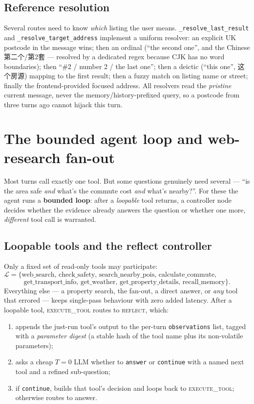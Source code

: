 \documentclass[11pt,a4paper]{article}
\newcommand{\code}[1]{\texttt{\small #1}}
\newcommand{\gnode}[1]{\textsc{#1}}  %
\begin{document}
\subsection{Reference resolution}
Several routes need to know \emph{which} listing the user means. \code{\_resolve\_last\_result}
and \code{\_resolve\_target\_address} implement a uniform resolver: an explicit UK
postcode in the message wins; then an ordinal (``the second one'', and the Chinese
第二个/第2套 --- resolved by a dedicated regex because
CJK has no word boundaries); then ``\#2 / number 2 / the last one''; then a deictic
(``this one'', 这个房源) mapping to the first result;
then a fuzzy match on listing name or street; finally the frontend-provided focused
address. All resolvers read the \emph{pristine} current message, never the
memory/history-prefixed query, so a postcode from three turns ago cannot hijack this
turn.

\section{The bounded agent loop and web-research fan-out}
\label{sec:loop}

Most turns call exactly one tool. But some questions genuinely need several ---
``is the area safe \emph{and} what's the commute cost \emph{and} what's nearby?''.
For these the agent runs a \textbf{bounded loop}: after a \emph{loopable} tool
returns, a controller node decides whether the evidence already answers the question
or whether one more, \emph{different} tool call is warranted.

\subsection{Loopable tools and the reflect controller}
Only a fixed set of read-only tools may participate:
\[
  \mathcal{L} = \{\text{web\_search, check\_safety, search\_nearby\_pois,
  calculate\_commute, calculate\_commute\_cost,}
\]
\[
  \text{get\_transport\_info, get\_weather, get\_property\_details, recall\_memory}\}.
\]
Everything else --- a property search, the fan-out, a direct answer, or \emph{any}
tool that errored --- keeps single-pass behaviour with zero added latency. After a
loopable tool, \gnode{execute\_tool} routes to \gnode{reflect}, which:
\begin{enumerate}[leftmargin=1.6em,itemsep=2pt]
  \item appends the just-run tool's output to the per-turn \code{observations} list,
        tagged with a \emph{parameter digest} (a stable hash of the tool name plus its
        non-volatile parameters);
  \item asks a cheap $T=0$ LLM whether to \code{answer} or \code{continue} with a
        named next tool and a refined sub-question;
  \item if \code{continue}, builds that tool's decision and loops back to
        \gnode{execute\_tool}; otherwise routes to answer.
\end{enumerate}
\end{document}
